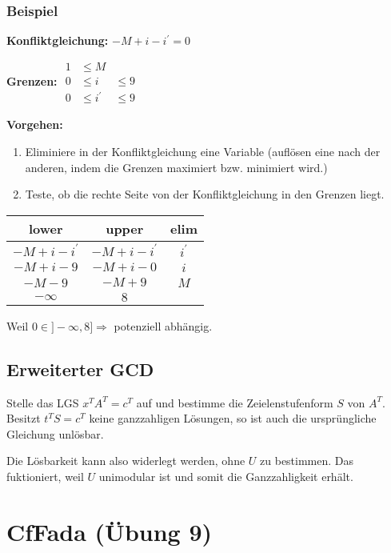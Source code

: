 \documentclass[a4paper,10pt]{article}
\begin{document}
\subsubsection*{Beispiel}
\textbf{Konfliktgleichung:} \( -M + i - i^\prime = 0 \)

\textbf{Grenzen:}
$\begin{array}{lll}
   1 & \leq M & \\
   0 & \leq i & \leq 9 \\
   0 & \leq i^\prime & \leq 9
\end{array}$

\textbf{Vorgehen:}
\begin{enumerate}
\item Eliminiere in der Konfliktgleichung eine Variable (auflösen eine nach der anderen, indem die Grenzen maximiert bzw. minimiert wird.)
\item Teste, ob die rechte Seite von der Konfliktgleichung in den Grenzen liegt.
\end{enumerate}
\begin{center}
\begin{tabular}{c|c|c}
lower & upper & elim \\
\hline
\( -M + i - i^\prime \) & \( -M+i-i^\prime\) & \(i^\prime \) \\
\hline
\( -M+ i - 9 \) & \( -M + i -0 \) & \( i \) \\
\hline
\(-M -9 \) & \( -M +9 \) & \( M \) \\
\hline
\( -\infty \) & \(8\) & \\
\end{tabular}
\end{center}

Weil \( 0 \in ] - \infty, 8 ] \Rightarrow \) potenziell abhängig.
\subsection{Erweiterter GCD}

Stelle das LGS $x^TA^T=c^T$ auf und bestimme die Zeielenstufenform $S$ von $A^T$.
Besitzt $t^TS=c^T$ keine ganzzahligen Lösungen, so ist auch die ursprüngliche Gleichung unlösbar.

Die Lösbarkeit kann also widerlegt werden, ohne $U$ zu bestimmen. Das fuktioniert, weil $U$ unimodular ist und somit die Ganzzahligkeit erhält.

\section{CfFada (Übung 9)}
\end{document}
